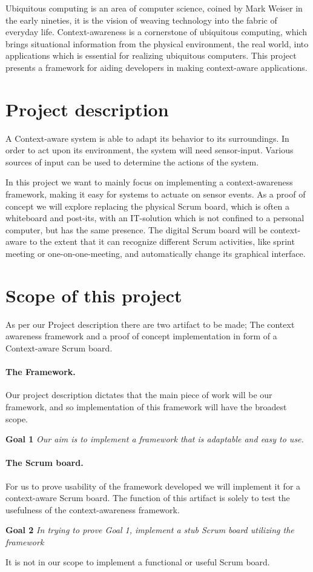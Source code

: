 \documentclass[../report.tex]{subfiles}
\begin{document}
\graphicspath{{img/}{../img/}}
Ubiquitous computing is an area of computer science, coined by Mark Weiser in the early nineties, it is the vision of weaving technology into the fabric of everyday life. Context-awareness is a cornerstone of ubiquitous computing, which brings situational information from the physical environment, the real world, into applications which is essential for realizing ubiquitous computers. This project presents a framework for aiding developers in making context-aware applications.

\section{Project description}
A Context-aware system is able to adapt its behavior to its surroundings. In order to act upon its environment, the system will need sensor-input. Various sources of input can be used to determine the actions of the system.

In this project we want to mainly focus on implementing a context-awareness framework, making it easy for systems to actuate on sensor events. As a proof of concept we will explore replacing the physical Scrum board, which is often a whiteboard and post-its, with an IT-solution which is not confined to a personal computer, but has the same presence. The digital Scrum board will be context-aware to the extent that it can recognize different Scrum activities, like sprint meeting or one-on-one-meeting, and automatically change its graphical interface.


\section{Scope of this project}
\label{scope}

As per our Project description there are two artifact to be made; The context awareness framework and a proof of concept implementation in form of a Context-aware Scrum board.

\paragraph{The Framework.} 
Our project description dictates that the main piece of work will be our framework, and so implementation of this framework will have the broadest scope.

\textbf{Goal 1} \textit{Our aim is to implement a framework that is adaptable and easy to use.}

\paragraph{The Scrum board.} 
For us to prove usability of the framework developed we will implement it for a context-aware Scrum board. The function of this artifact is solely to test the usefulness of the context-awareness framework.

\textbf{Goal 2} \textit{In trying to prove Goal 1, implement a stub Scrum board utilizing the framework}

It is not in our scope to implement a functional or useful Scrum board.
\end{document}
